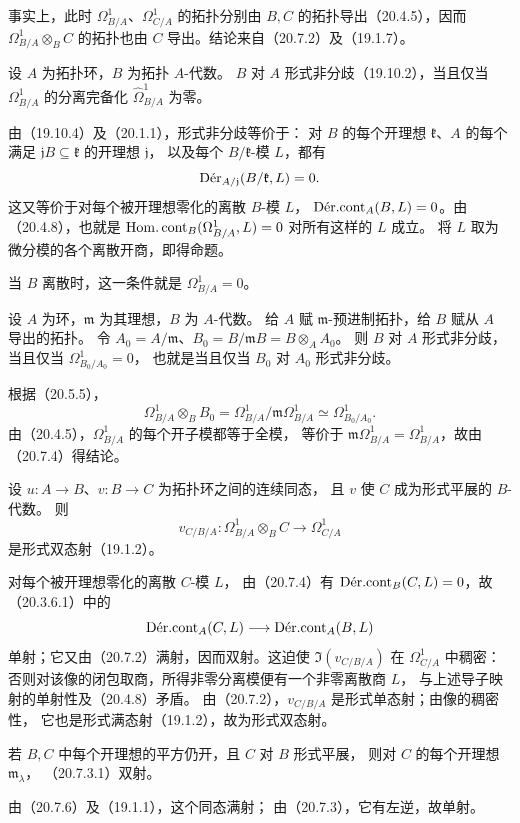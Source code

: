 事实上，此时 $\Omega^1_{B/A}$、$\Omega^1_{C/A}$ 的拓扑分别由
$B,C$ 的拓扑导出（20.4.5），因而 $\Omega^1_{B/A}\otimes_B C$
的拓扑也由 $C$ 导出。结论来自（20.7.2）及（19.1.7）。

设 $A$ 为拓扑环，$B$ 为拓扑 $A$-代数。
$B$ 对 $A$ 形式非分歧（19.10.2），当且仅当
$\Omega^1_{B/A}$ 的分离完备化 $\widehat{\Omega}^1_{B/A}$ 为零。

由（19.10.4）及（20.1.1），形式非分歧等价于：
对 $B$ 的每个开理想 $\mathfrak k$、$A$ 的每个满足
$\mathfrak jB\subseteq\mathfrak k$ 的开理想 $\mathfrak j$，
以及每个 $B/\mathfrak k$-模 $L$，都有
\[
 \Der_{A/\mathfrak j}(B/\mathfrak k,L)=0 .
\]
这又等价于对每个被开理想零化的离散 $B$-模 $L$，
$\DerCont_A(B,L)=0$。由（20.4.8），也就是
$\HomCont_B(\Omega^1_{B/A},L)=0$ 对所有这样的 $L$ 成立。
将 $L$ 取为微分模的各个离散开商，即得命题。

当 $B$ 离散时，这一条件就是 $\Omega^1_{B/A}=0$。

设 $A$ 为环，$\mathfrak m$ 为其理想，$B$ 为 $A$-代数。
给 $A$ 赋 $\mathfrak m$-预进制拓扑，给 $B$ 赋从 $A$ 导出的拓扑。
令 $A_0=A/\mathfrak m$、$B_0=B/\mathfrak mB=B\otimes_A A_0$。
则 $B$ 对 $A$ 形式非分歧，当且仅当 $\Omega^1_{B_0/A_0}=0$，
也就是当且仅当 $B_0$ 对 $A_0$ 形式非分歧。

根据（20.5.5），
\[
 \Omega^1_{B/A}\otimes_B B_0
 =\Omega^1_{B/A}/\mathfrak m\Omega^1_{B/A}
 \simeq\Omega^1_{B_0/A_0}.
\]
由（20.4.5），$\Omega^1_{B/A}$ 的每个开子模都等于全模，
等价于 $\mathfrak m\Omega^1_{B/A}=\Omega^1_{B/A}$，故由（20.7.4）得结论。

设 $u:A\to B$、$v:B\to C$ 为拓扑环之间的连续同态，
且 $v$ 使 $C$ 成为形式平展的 $B$-代数。
则
\[
 v_{C/B/A}:\Omega^1_{B/A}\otimes_B C\longrightarrow\Omega^1_{C/A}
\]
是形式双态射（19.1.2）。

对每个被开理想零化的离散 $C$-模 $L$，
由（20.7.4）有 $\DerCont_B(C,L)=0$，故（20.3.6.1）中的
\[
 \DerCont_A(C,L)\longrightarrow\DerCont_A(B,L)
\]
单射；它又由（20.7.2）满射，因而双射。这迫使
$\Im(v_{C/B/A})$ 在 $\Omega^1_{C/A}$ 中稠密：
否则对该像的闭包取商，所得非零分离模便有一个非零离散商 $L$，
与上述导子映射的单射性及（20.4.8）矛盾。
由（20.7.2），$v_{C/B/A}$ 是形式单态射；由像的稠密性，
它也是形式满态射（19.1.2），故为形式双态射。

若 $B,C$ 中每个开理想的平方仍开，且 $C$ 对 $B$ 形式平展，
则对 $C$ 的每个开理想 $\mathfrak m_\lambda$，
（20.7.3.1）双射。

由（20.7.6）及（19.1.1），这个同态满射；
由（20.7.3），它有左逆，故单射。

